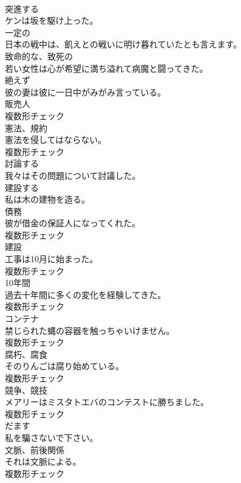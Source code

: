 \documentclass[8pt]{extreport}
\begin{document}
\begin{CJK}{UTF8}{min}
\\	[動詞]	突進する	
\\	ケンは坂を駆け上った。	
\\	[形容詞]	一定の	
\\	日本の戦中は、飢えとの戦いに明け暮れていたとも言えます。	
\\	[形容詞]	致命的な、致死の	
\\	若い女性は心が希望に満ち溢れて病魔と闘ってきた。	
\\	[副詞]	絶えず	
\\	彼の妻は彼に一日中がみがみ言っている。	
\\	[名詞]	販売人	
\\	複数形チェック
\\	[名詞]	憲法、規約	
\\	憲法を侵してはならない。	
\\	複数形チェック
\\	[動詞]	討論する	
\\	我々はその問題について討議した。	
\\	[動詞]	建設する	
\\	私は木の建物を造る。	
\\	[名詞]	債務	
\\	彼が借金の保証人になってくれた。	
\\	複数形チェック
\\	[名詞]	建設	
\\	工事は10月に始まった。	
\\	複数形チェック
\\	[名詞]	10年間	
\\	過去十年間に多くの変化を経験してきた。	
\\	複数形チェック
\\	[名詞]	コンテナ	
\\	禁じられた蝿の容器を触っちゃいけません。	
\\	複数形チェック
\\	[名詞]	腐朽、腐食	
\\	そのりんごは腐り始めている。	
\\	複数形チェック
\\	[名詞]	競争、競技	
\\	メアリーはミスタトエバのコンテストに勝ちました。	
\\	複数形チェック
\\	[動詞]	だます	
\\	私を騙さないで下さい。	
\\	[名詞]	文脈、前後関係	
\\	それは文脈による。	
\\	複数形チェック

\end{CJK}
\end{document}
